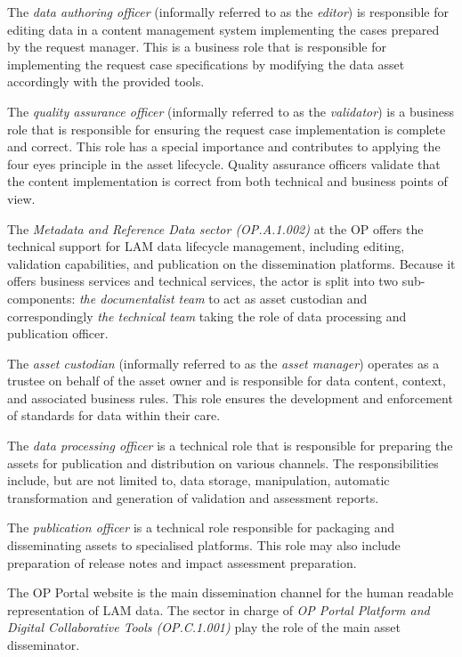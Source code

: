 	The \textit{data authoring officer} (informally referred to as the \textit{editor}) is responsible for editing data in a content management system implementing the cases prepared by the request manager. This is a business role that is responsible for implementing the request case specifications by modifying the data asset accordingly with the provided tools.
	
	The \textit{quality assurance officer} (informally referred to as the \textit{validator}) is a business role that is responsible for ensuring the request case implementation is complete and correct. This role has a special importance and contributes to applying the four eyes principle in the asset lifecycle. Quality assurance officers validate that the content implementation is correct from both technical and business points of view.
	
	The \textit{Metadata and Reference Data sector (OP.A.1.002)} at the OP offers the technical support for LAM data lifecycle management, including editing, validation capabilities, and publication on the dissemination platforms. Because it offers business services and technical services, the actor is split into two sub-components: \textit{the documentalist team} to act as asset custodian and correspondingly \textit{the technical team} taking the role of data processing and publication officer.
	
	The \textit{asset custodian} (informally referred to as the \textit{asset manager}) operates as a trustee on behalf of the asset owner and is responsible for data content, context, and associated business rules. This role ensures the development and enforcement of standards for data within their care.
	
	The \textit{data processing officer} is a technical role that is responsible for preparing the assets for publication and distribution on various channels. The responsibilities include, but are not limited to, data storage, manipulation, automatic transformation and generation of validation and assessment reports.
	
	The \textit{publication officer} is a technical role responsible for packaging and disseminating assets to specialised platforms. This role may also include preparation of release notes and impact assessment preparation. 
	
	The OP Portal website is the main dissemination channel for the human readable representation of LAM data. The sector in charge of \textit{OP Portal Platform and Digital Collaborative Tools (OP.C.1.001)} play the role of the main asset disseminator. 
		
